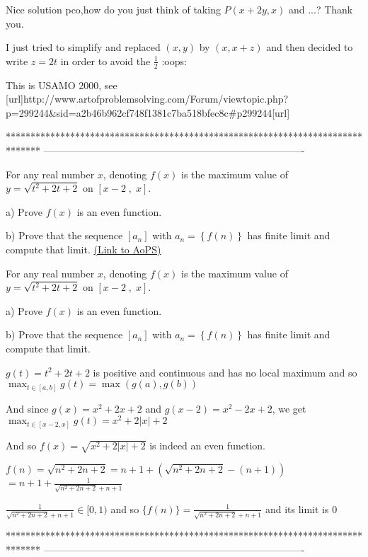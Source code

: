 \begin{solution}
	\begin{tcolorbox} Nice solution pco,how do you just think of taking $P(x+2y,x)$ and ...?
Thank you.\end{tcolorbox}

I just tried to simplify and replaced $(x,y)$ by $(x,x+z)$ and then decided to write $z=2t$ in order to avoid the $\frac 12$ :oops:
\end{solution}



\begin{solution}
	This is USAMO 2000, see [url]http://www.artofproblemsolving.com/Forum/viewtopic.php?p=299244&sid=a2b46b962cf748f1381c7ba518bfec8c#p299244[\/url]
\end{solution}
*******************************************************************************
-------------------------------------------------------------------------------

\begin{problem}
	For any real number $x$, denoting $f(x)$ is the maximum value of $y=\sqrt{t^2+2t+2}$ on $[x-2 \; , \; x]$.

a) Prove $f(x)$ is an even function.

b) Prove that the sequence $[{a_n}]$ with $a_n=\left\{ {f\left( n \right)} \right\}$ has finite limit and compute that limit.
	\flushright \href{https://artofproblemsolving.com/community/c6h389158}{(Link to AoPS)}
\end{problem}



\begin{solution}
	\begin{tcolorbox}For any real number $x$, denoting $f(x)$ is the maximum value of $y=\sqrt{t^2+2t+2}$ on $[x-2 \; , \; x]$.

a) Prove $f(x)$ is an even function.

b) Prove that the sequence $[{a_n}]$ with $a_n=\left\{ {f\left( n \right)} \right\}$ has finite limit and compute that limit.\end{tcolorbox}
$g(t)=t^2+2t+2$ is positive and continuous and has no local maximum and so $\max_{t\in[a,b]}g(t)=\max(g(a),g(b))$

And since $g(x)=x^2+2x+2$ and $g(x-2)=x^2-2x+2$, we get $\max_{t\in[x-2,x]}g(t)=x^2+2|x|+2$

And so $f(x)=\sqrt {x^2+2|x|+2}$ is indeed an even function.

$f(n)=\sqrt{n^2+2n+2}=n+1+(\sqrt{n^2+2n+2}-(n+1))$ $=n+1+\frac 1{\sqrt{n^2+2n+2}+n+1}$

$\frac 1{\sqrt{n^2+2n+2}+n+1}\in[0,1)$ and so $\{f(n)\}=\frac 1{\sqrt{n^2+2n+2}+n+1}$ and its limit is $0$
\end{solution}
*******************************************************************************
-------------------------------------------------------------------------------

